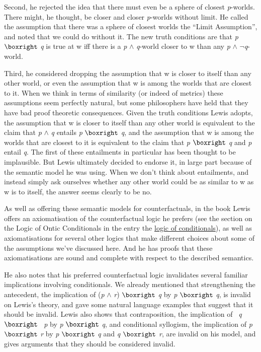 Second, he rejected the idea that there must even be a sphere of closest \textit{p}-worlds. There might, he thought, be closer and closer \textit{p}-worlds without limit. He called the assumption that there was a sphere of closest worlds the ``Limit Assumption'', and noted that we could do without it. The new truth conditions are that \textit{p} \(\boxright\) \textit{q} is true at w iff there is a \textit{p} \(\wedge\) \textit{q}-world closer to w than any \textit{p} \(\wedge\) \(\neg\)\textit{q}-world.

Third, he considered dropping the assumption that w is closer to itself than any other world, or even the assumption that w is among the worlds that are closest to it. When we think in terms of similarity (or indeed of metrics) these assumptions seem perfectly natural, but some philosophers have held that they have bad proof theoretic consequences. Given the truth conditions Lewis adopts, the assumption that w is closer to itself than any other world is equivalent to the claim that \textit{p} \(\wedge\) \textit{q} entails \textit{p} \(\boxright\) \textit{q}, and the assumption that w is among the worlds that are closest to it is equivalent to the claim that \textit{p} \(\boxright\) \textit{q} and \textit{p} entail \textit{q}. The first of these entailments in particular has been thought to be implausible. But Lewis ultimately decided to endorse it, in large part because of the semantic model he was using. When we don't think about entailments, and instead simply ask ourselves whether any other world could be as similar to w as w is to itself, the answer seems clearly to be no.

As well as offering these semantic models for counterfactuals, in the book Lewis offers an axiomatisation of the counterfactual logic he prefers (see the section on the Logic of Ontic Conditionals in the entry the \href{http://plato.stanford.edu/logic-conditionals/index.html#LogOntCon}{logic of conditionals}), as well as axiomatisations for several other logics that make different choices about some of the assumptions we've discussed here. And he has proofs that these axiomatisations are sound and complete with respect to the described semantics.

He also notes that his preferred counterfactual logic invalidates several familiar implications involving conditionals. We already mentioned that strengthening the antecedent, the implication of (\textit{p} \(\wedge\) \textit{r}) \(\boxright\) \textit{q} by \textit{p} \(\boxright\) \textit{q}, is invalid on Lewis's theory, and gave some natural language examples that suggest that it should be invalid. Lewis also shows that contraposition, the implication of ~\textit{q} \(\boxright\) ~\textit{p} by \textit{p} \(\boxright\) \textit{q}, and conditional syllogism, the implication of \textit{p} \(\boxright\) \textit{r} by \textit{p} \(\boxright\) \textit{q} and \textit{q} \(\boxright\) \textit{r}, are invalid on his model, and gives arguments that they should be considered invalid.

